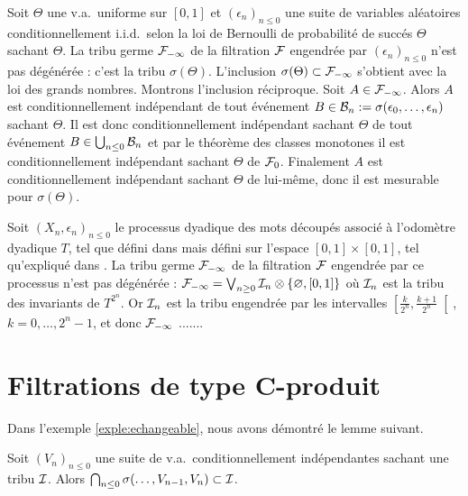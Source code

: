 \documentclass[12pt,a4paper]{article}
\begin{document}
\begin{exemple}\label{exple:echangeable}
Soit $\Theta$ une v.a.\ uniforme sur $[0,1]$ et ${(\epsilon_n)}_{n \leq 0}$ 
une suite de variables aléatoires conditionnellement i.i.d.\ 
selon la loi de Bernoulli de probabilité de succés $\Theta$ sachant 
$\Theta$. 
La tribu germe $\mathcal{F}_{-\infty}$ de la filtration $\mathcal{F}$ engendrée par 
${(\epsilon_n)}_{n \leq 0}$ n'est pas dégénérée : c'est la tribu $\sigma(\Theta)$. 
L'inclusion $\sigma(\Theta) \subset \mathcal{F}_{-\infty}$ s'obtient avec la loi des 
grands nombres. Montrons l'inclusion réciproque. 
Soit $A \in \mathcal{F}_{-\infty}$. Alors $A$ est conditionnellement 
indépendant de tout événement 
$B \in \mathcal{B}_n := \sigma(\epsilon_0, \ldots, \epsilon_n)$ sachant 
$\Theta$. Il est donc conditionnellement 
indépendant sachant $\Theta$ de tout événement 
$B \in \bigcup_{n \leq 0}\mathcal{B}_n$ et par le théorème des classes monotones 
il est conditionnellement indépendant sachant $\Theta$ de $\mathcal{F}_0$. 
Finalement $A$ est conditionnellement indépendant sachant 
$\Theta$ de lui-même, donc il est mesurable pour $\sigma(\Theta)$. 
\end{exemple}


\begin{exemple}
Soit ${(X_n, \epsilon_n)}_{n \leq 0}$ le processus dyadique des mots découpés 
associé à l'odomètre dyadique $T$, tel que défini dans \cite{LauXLV} mais 
défini sur l'espace $[0,1] \times [0,1]$, tel qu'expliqué dans \cite{LauScale}.
 La tribu germe $\mathcal{F}_{-\infty}$ de la filtration $\mathcal{F}$ engendrée par 
ce processus n'est pas dégénérée : 
$\mathcal{F}_{-\infty} = \bigvee_{n \geq 0} \mathcal{I}_n \otimes \{\varnothing, [0,1]\}$ 
où $\mathcal{I}_n$ est la tribu des invariants de $T^{2^n}$. 
Or $\mathcal{I}_n$ est la tribu engendrée par les intervalles 
 $\left[\frac{k}{2^n}, \frac{k+1}{2^n}\right[$, $k=0, \ldots, 2^{n}-1$, 
et donc $\mathcal{F}_{-\infty}$ .......
\end{exemple}



\section{Filtrations de type C-produit}

Dans l'exemple \ref{exple:echangeable}, nous avons démontré le lemme suivant.

\begin{lemme}\label{lemme:tribuI}
Soit ${(V_n)}_{n \leq 0}$ une suite de v.a.\ conditionnellement indépendantes 
sachant une tribu $\mathcal{I}$. Alors 
$\bigcap_{n \leq 0}\sigma(\ldots, V_{n-1}, V_n) \subset \mathcal{I}$.
\end{lemme}
\end{document}

